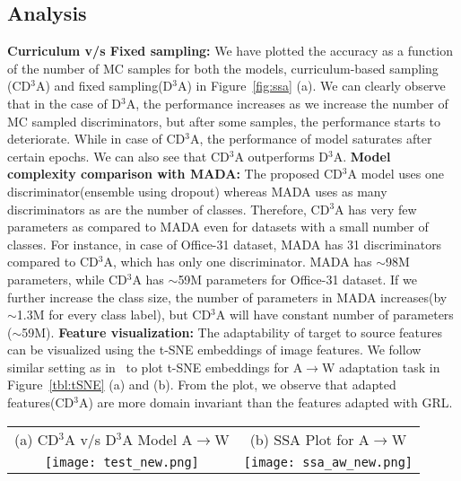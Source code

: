 \documentclass{bmvc2k}
\begin{document}
\subsection{Analysis}
\textbf{{Curriculum v/s Fixed sampling:}}
We have plotted the accuracy as a function of the number of MC samples for both the models, curriculum-based sampling (CD$^3$A) and fixed sampling\newline (D$^{3}$A) in Figure~\ref{fig:ssa} (a). We can clearly observe that in the case of D$^{3}$A, the performance increases as we increase the number of MC sampled discriminators, but after some samples, the performance starts to deteriorate. While in case of CD$^3$A, the performance of model saturates after certain epochs. We can also see that CD$^3$A outperforms D$^{3}$A.
\newline
\textbf{Model complexity comparison with MADA:}
The proposed CD$^3$A model uses one discriminator(ensemble using dropout) whereas MADA uses as many discriminators as are the number of classes. Therefore, CD$^3$A has very few parameters as compared to MADA even for datasets with a small number of classes. For instance, in case of Office-31 dataset, MADA has 31 discriminators compared to CD$^3$A, which has only one discriminator. MADA has $\sim$98M parameters, while CD$^3$A has $\sim$59M parameters for Office-31 dataset. If we further increase the class size, the number of parameters in MADA increases(by $\sim$1.3M for every class label), but  CD$^3$A will have constant number of parameters ($\sim$59M). 
\newline
\textbf{{Feature visualization:}}
The adaptability  of target to source features can be visualized using the t-SNE embeddings of image features. We follow similar setting as in~\cite{ganin_ICML2015} to plot t-SNE embeddings for A$\rightarrow$W adaptation task in Figure~\ref{tbl:tSNE} (a) and (b). From the plot, we observe that adapted features(CD$^{3}$A) are more domain invariant than the features adapted with GRL.



\begin{figure*}[!]
 \small
\centering
 \begin{tabular}[b]{ c   c }
(a) CD$^3$A v/s D$^3$A Model  A$\rightarrow$W &  (b) SSA Plot for A$\rightarrow$W   \\
\texttt{[image: test\_new.png]} & 
\begin{minipage}[b][0.18\textheight][s]{0.30\textwidth}
  \centering
\texttt{[image: ssa\_aw\_new.png]}
\end{minipage}
\end{tabular}
  
\caption{(a) Accuracy v/s Number of MC samples for D$^3$A and CD$^3$A model. Note that in  D$^3$A model, each model is trained separately and reported accuracy after the training, while in  CD$^3$A model the accuracy is calculated with single training process (b) Analysis of statistically significant difference for A $\rightarrow$ W in Binary label Discriminator (GRL) \cite{ganin_ICML2015}, proposed model and Source only methods, with a significance level of 0.05.}
\label{fig:ssa}
\end{figure*}
\end{document}
